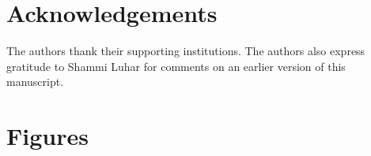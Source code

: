 \documentclass{bmcart}
\begin{document}
\begin{backmatter}
\section*{Acknowledgements}
The authors thank their supporting institutions. The authors also express gratitude to Shammi Luhar for comments on an earlier version of this manuscript.





\section*{Figures}


\end{backmatter}
\end{document}
